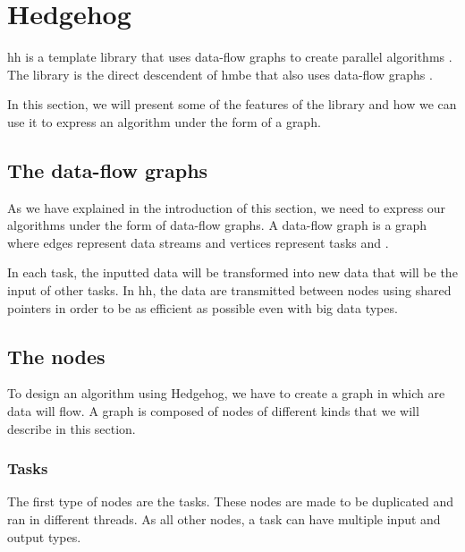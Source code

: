 
\section{Hedgehog}
\label{sec:hh}

\gls{hh} is a template library that uses data-flow graphs to create
parallel algorithms \cite{bardakoff2021analysis}. The library is the direct
descendent of \gls{hmbe} that also uses data-flow graphs
\cite{blattner2017model}.

In this section, we will present some of the features of the library and how
we can use it to express an algorithm under the form of a graph.

\subsection{The data-flow graphs}

As we have explained in the introduction of this section, we need to express our
algorithms under the form of data-flow graphs. A data-flow graph is a graph
where edges represent data streams and vertices represent tasks
\cite{kavi1986formal} and \cite{bardakoff2021analysis}.


In each task, the inputted data will be transformed into new data that will be
the input of other tasks. In \gls{hh}, the data are transmitted between nodes
using shared pointers in order to be as efficient as possible even with big
data types. %

\subsection{The nodes}

To design an algorithm using Hedgehog, we have to create a graph in which are
data will flow. A graph is composed of nodes of different kinds that we will
describe in this section.

\subsubsection{Tasks}

The first type of nodes are the tasks. These nodes are made to be duplicated and
ran in different threads. As all other nodes, a task can have multiple input and
output types.

